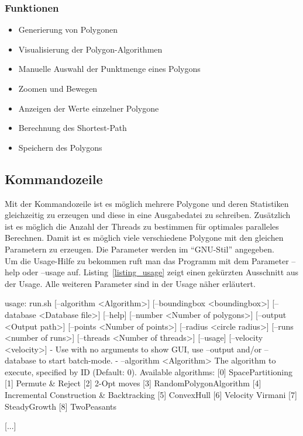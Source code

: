 \subsubsection{Funktionen}
\begin{itemize}
	\item Generierung von Polygonen
	\item Visualisierung der Polygon-Algorithmen
	\item Manuelle Auswahl der Punktmenge eines Polygons
	\item Zoomen und Bewegen
	\item Anzeigen der Werte einzelner Polygone
	\item Berechnung des Shortest-Path
	\item Speichern des Polygons
\end{itemize}

\subsection{Kommandozeile}
Mit der Kommandozeile ist es möglich mehrere Polygone und deren Statistiken gleichzeitig zu erzeugen und diese in eine Ausgabedatei zu schreiben. Zusätzlich ist es möglich die Anzahl der Threads zu bestimmen für optimales paralleles Berechnen. Damit ist es möglich viele verschiedene Polygone mit den gleichen Parametern zu erzeugen. Die Parameter werden im \enquote{GNU-Stil} angegeben.\\
Um die Usage-Hilfe zu bekommen ruft man das Programm mit dem Parameter --help oder --usage auf. Listing~\ref{listing_usage} zeigt einen gekürzten Ausschnitt aus der Usage. Alle weiteren Parameter sind in der Usage näher erläutert.

\begin{code}[caption={Usage der Kommandozeile},label=listing_usage]
usage: run.sh [--algorithm <Algorithm>] [--boundingbox <boundingbox>]
       [--database <Database file>] [--help] [--number <Number of
       polygons>] [--output <Output path>] [--points <Number of points>]
       [--radius <circle radius>] [--runs <number of runs>] [--threads
       <Number of threads>] [--usage] [--velocity <velocity>]
-
Use with no arguments to show GUI, use --output and/or --database to start
batch-mode.
-
    --algorithm <Algorithm>         The algorithm to execute, specified by
                                    ID (Default: 0). Available algorithms:
                                    [0] SpacePartitioning
                                    [1] Permute & Reject
                                    [2] 2-Opt moves
                                    [3] RandomPolygonAlgorithm
                                    [4] Incremental Construction &
                                    Backtracking
                                    [5] ConvexHull
                                    [6] Velocity Virmani
                                    [7] SteadyGrowth
                                    [8] TwoPeasants

[...]
\end{code}

